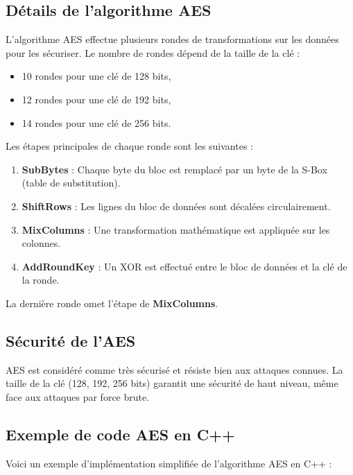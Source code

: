 \documentclass[12pt,a4paper]{article}
\begin{document}
\subsection{Détails de l'algorithme AES}
L'algorithme AES effectue plusieurs rondes de transformations sur les données pour les sécuriser. Le nombre de rondes dépend de la taille de la clé :

\begin{itemize}
    \item 10 rondes pour une clé de 128 bits,
    \item 12 rondes pour une clé de 192 bits,
    \item 14 rondes pour une clé de 256 bits.
\end{itemize}

Les étapes principales de chaque ronde sont les suivantes :
\begin{enumerate}
    \item \textbf{SubBytes} : Chaque byte du bloc est remplacé par un byte de la S-Box (table de substitution).
    \item \textbf{ShiftRows} : Les lignes du bloc de données sont décalées circulairement.
    \item \textbf{MixColumns} : Une transformation mathématique est appliquée sur les colonnes.
    \item \textbf{AddRoundKey} : Un XOR est effectué entre le bloc de données et la clé de la ronde.
\end{enumerate}

La dernière ronde omet l'étape de \textbf{MixColumns}.

\subsection{Sécurité de l'AES}
AES est considéré comme très sécurisé et résiste bien aux attaques connues. La taille de la clé (128, 192, 256 bits) garantit une sécurité de haut niveau, même face aux attaques par force brute.

\subsection{Exemple de code AES en C++}
Voici un exemple d'implémentation simplifiée de l'algorithme AES en C++ :
\end{document}
